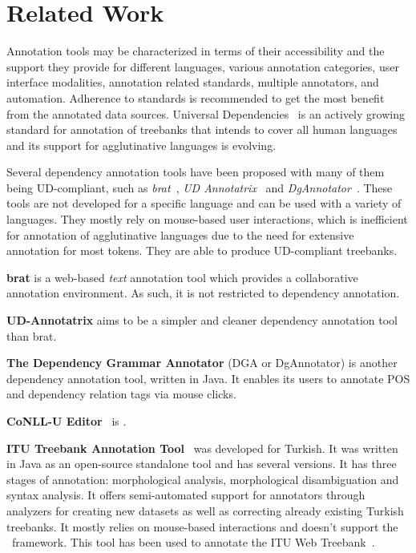 \section{Related Work}
\label{sec:related}

Annotation tools may be characterized in terms of their accessibility and the support they provide for different languages, various annotation categories, user interface modalities, annotation related standards, multiple annotators, and automation.
Adherence to standards is recommended to get the most benefit from the annotated data sources.
Universal Dependencies~\cite{UD} is an actively growing standard for annotation of treebanks that intends to cover all human languages and its support for agglutinative languages is evolving.

Several dependency annotation tools have been proposed with many of them being UD-compliant, such as \textit{brat}~\cite{brat}, \textit{UD Annotatrix}~\cite{ud-annotatrix} and \textit{DgAnnotator}~\cite{dgannotator}.
These tools are not developed for a specific language and can be used with a variety of languages.
They mostly rely on mouse-based user interactions, which is inefficient for annotation of agglutinative languages due to the need for extensive annotation for most tokens.
They are able to produce UD-compliant treebanks.

\textbf{brat} is a web-based \textit{text} annotation tool which provides a collaborative annotation environment. As such, it is not restricted to dependency annotation.

\textbf{UD-Annotatrix} aims to be a simpler and cleaner dependency annotation tool than brat.

\textbf{The Dependency Grammar Annotator} (DGA or DgAnnotator) is another dependency annotation tool, written in Java. It enables its users to annotate POS and dependency relation tags via mouse clicks.

\textbf{CoNLL-U Editor}~\cite{conll-u_editor} is .

\textbf{ITU Treebank Annotation Tool}~\cite{itu-annotation-tool} was developed for Turkish.
It was written in Java as an open-source standalone tool and has several versions.
It has three stages of annotation: morphological analysis, morphological disambiguation and syntax analysis.
It offers semi-automated support for annotators through analyzers for creating new datasets as well as correcting already existing Turkish treebanks.
It mostly relies on mouse-based interactions and doesn't support the \ud\ framework.
This tool has been used to annotate the ITU Web Treebank~\cite{itu-web-tb}.

